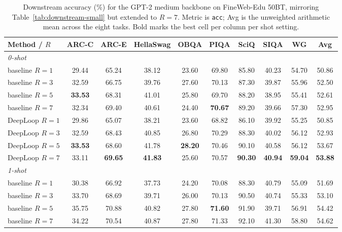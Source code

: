 \documentclass[11pt]{airesearch}
\begin{document}
\begin{table}[ht]
  \centering
  \footnotesize
  \caption{Downstream accuracy (\%) for the GPT-2 medium backbone on
    FineWeb-Edu 50BT, mirroring Table~\ref{tab:downstream-small} but
    extended to $R{=}7$. Metric is \texttt{acc}; Avg is the unweighted
    arithmetic mean across the eight tasks. Bold marks the best cell
    per column per shot setting.}
  \label{tab:downstream-medium}
  \begin{tabular}{lcccccccc c}
    \toprule
    Method / $R$ & ARC-C & ARC-E & HellaSwag & OBQA & PIQA & SciQ & SIQA & WG & \textbf{Avg} \\
    \midrule
    \multicolumn{10}{l}{\emph{0-shot}} \\
    baseline $R{=}1$       & 29.44 & 65.24 & 38.12 & 23.60 & 69.80 & 85.80 & 40.23 & 54.70 & 50.86 \\
    baseline $R{=}3$       & 32.59 & 66.75 & 39.76 & 27.60 & 70.13 & 87.30 & 39.87 & 55.96 & 52.50 \\
    baseline $R{=}5$       & \textbf{33.53} & 68.31 & 41.01 & 25.80 & 69.70 & 88.20 & 38.95 & 55.41 & 52.61 \\
    baseline $R{=}7$       & 32.34 & 69.40 & 40.61 & 24.40 & \textbf{70.67} & 89.20 & 39.66 & 57.30 & 52.95 \\
    DeepLoop $R{=}1$   & 29.86 & 65.07 & 38.21 & 23.60 & 68.82 & 86.10 & 39.92 & 55.25 & 50.85 \\
    DeepLoop $R{=}3$   & 32.59 & 68.43 & 40.85 & 26.80 & 70.29 & 88.30 & 40.02 & 56.12 & 52.93 \\
    DeepLoop $R{=}5$   & \textbf{33.53} & 68.60 & 41.78 & \textbf{28.20} & 70.46 & 90.10 & 40.58 & 56.12 & 53.67 \\
    DeepLoop $R{=}7$   & 33.11 & \textbf{69.65} & \textbf{41.83} & 25.60 & 70.57 & \textbf{90.30} & \textbf{40.94} & \textbf{59.04} & \textbf{53.88} \\
    \midrule
    \multicolumn{10}{l}{\emph{1-shot}} \\
    baseline $R{=}1$       & 30.38 & 66.92 & 37.73 & 24.20 & 70.08 & 88.30 & 40.79 & 55.09 & 51.69 \\
    baseline $R{=}3$       & 33.70 & 68.69 & 39.71 & 26.00 & 70.13 & 90.50 & 40.74 & 55.33 & 53.10 \\
    baseline $R{=}5$       & 35.75 & 70.88 & 40.82 & 27.80 & \textbf{71.60} & 91.90 & 39.71 & 56.91 & 54.42 \\
    baseline $R{=}7$       & 34.22 & 70.54 & 40.87 & 27.80 & 71.33 & 92.10 & 41.30 & 58.80 & 54.62 \\

\end{tabular}
\end{table}
\end{document}
